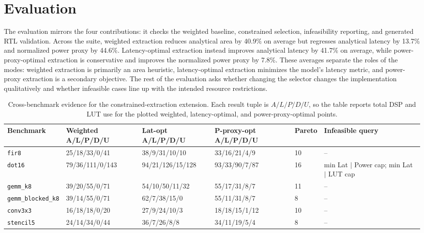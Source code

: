 \documentclass[sigplan,10pt,review]{acmart}
\begin{document}
\section{Evaluation}
The evaluation mirrors the four contributions: it checks the weighted baseline, constrained selection, infeasibility reporting, and generated RTL validation.
Across the suite, weighted extraction reduces analytical area by 40.9\% on average but regresses analytical latency by 13.7\% and normalized power proxy by 44.6\%. Latency-optimal extraction instead improves analytical latency by 41.7\% on average, while power-proxy-optimal extraction is conservative and improves the normalized power proxy by 7.8\%. These averages separate the roles of the modes: weighted extraction is primarily an area heuristic, latency-optimal extraction minimizes the model's latency metric, and power-proxy extraction is a secondary objective. The rest of the evaluation asks whether changing the selector changes the implementation qualitatively and whether infeasible cases line up with the intended resource restrictions.

\begin{table}[t]
\caption{Cross-benchmark evidence for the constrained-extraction extension. Each result tuple is $A/L/P/D/U$, so the table reports total DSP and LUT use for the plotted weighted, latency-optimal, and power-proxy-optimal points.}
\label{tab:main-results}
\centering
\scriptsize
\setlength{\tabcolsep}{3pt}
\begin{tabular}{p{}p{}p{}p{}p{}p{}}
\toprule
Benchmark & Weighted A/L/P/D/U & Lat-opt A/L/P/D/U & P-proxy-opt A/L/P/D/U & Pareto & Infeasible query \\
\midrule
\texttt{fir8} & 25/18/33/0/41 & 38/9/31/10/10 & 33/16/21/4/9 & 10 & -- \\
\texttt{dot16} & 79/36/111/0/143 & 94/21/126/15/128 & 93/33/90/7/87 & 16 & min Lat $|$ Power cap; min Lat $|$ LUT cap \\
\texttt{gemm\_k8} & 39/20/55/0/71 & 54/10/50/11/32 & 55/17/31/8/7 & 11 & -- \\
\texttt{gemm\_blocked\_k8} & 39/14/55/0/71 & 62/7/38/15/0 & 55/11/31/8/7 & 8 & -- \\
\texttt{conv3x3} & 16/18/18/0/20 & 27/9/24/10/3 & 18/18/15/1/12 & 10 & -- \\
\texttt{stencil5} & 24/14/34/0/44 & 36/7/26/8/8 & 34/11/19/5/4 & 8 & -- \\
\bottomrule
\end{tabular}
\end{table}
\end{document}
